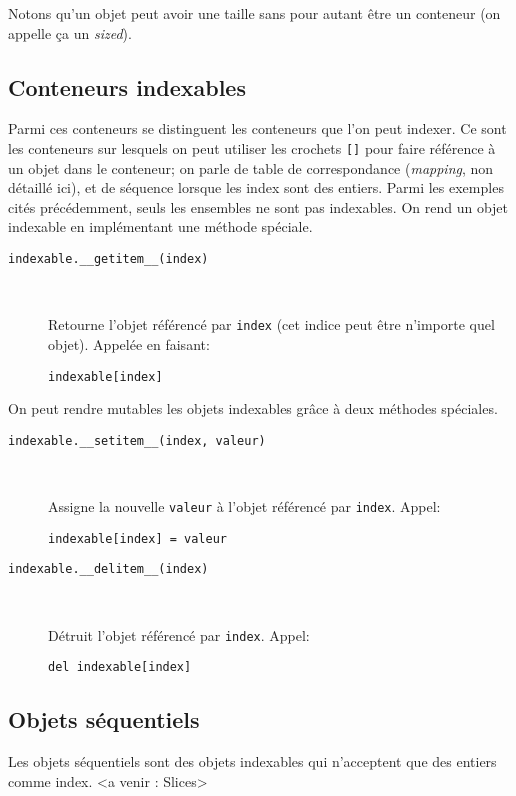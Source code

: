 Notons qu'un objet peut avoir une taille sans pour autant être un conteneur (on appelle ça un \emph{sized}).

\subsection{Conteneurs indexables}
Parmi ces conteneurs se distinguent les conteneurs que l'on peut indexer. Ce sont les conteneurs sur lesquels on peut utiliser les crochets \texttt{[]} pour faire référence à un objet dans le conteneur; on parle de table de correspondance (\emph{mapping}, non détaillé ici), et de séquence lorsque les index sont des entiers. Parmi les exemples cités précédemment, seuls les ensembles ne sont pas indexables. On rend un objet indexable en implémentant une méthode spéciale.

\begin{description}
    \item[\texttt{indexable.__getitem__(index)}]~

    Retourne l'objet référencé par \texttt{index} (cet indice peut être n'importe quel objet). Appelée en faisant:
    \begin{verbatim}
indexable[index]
    \end{verbatim}
\end{description}

On peut rendre mutables les objets indexables grâce à deux méthodes spéciales.

\begin{description}
    \item[\texttt{indexable.__setitem__(index, valeur)}]~

    Assigne la nouvelle \texttt{valeur} à l'objet référencé par \texttt{index}. Appel:
    \begin{verbatim}
indexable[index] = valeur
    \end{verbatim}

    \item[\texttt{indexable.__delitem__(index)}]~

    Détruit l'objet référencé par \texttt{index}. Appel:
    \begin{verbatim}
del indexable[index]
    \end{verbatim}
\end{description}

\subsection{Objets séquentiels}

Les objets séquentiels sont des objets indexables qui n'acceptent que des entiers comme index. <a venir : Slices>
